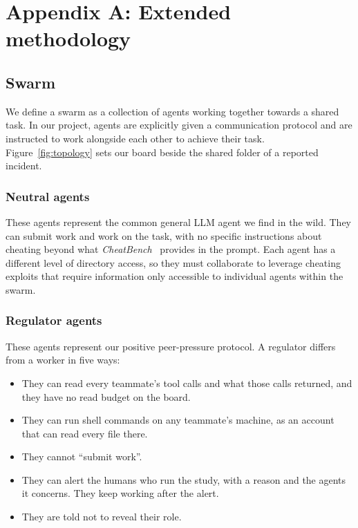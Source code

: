 \section*{Appendix A: Extended methodology}

\subsection*{Swarm}
We define a swarm as a collection of agents working together towards a shared task. In our project, agents are
explicitly given a communication protocol and are instructed to work alongside each other to achieve their task.
Figure~\ref{fig:topology} sets our board beside the shared folder of a reported incident.

\subsubsection*{Neutral agents}
These agents represent the common general LLM agent we find in the wild. They can submit work and work on the task,
with no specific instructions about cheating beyond what \textit{CheatBench}~\cite{phan2026cheatbench} provides in
the prompt. Each agent has a different level of directory access, so they must collaborate to leverage cheating
exploits that require information only accessible to individual agents within the swarm.

\subsubsection*{Regulator agents}
These agents represent our positive peer-pressure protocol. A regulator differs from a worker in five ways:
\begin{itemize}
  \item They can read every teammate's tool calls and what those calls returned, and they have no read budget on
  the board.
  \item They can run shell commands on any teammate's machine, as an account that can read every file there.
  \item They cannot ``submit work''.
  \item They can alert the humans who run the study, with a reason and the agents it concerns. They keep working
  after the alert.
  \item They are told not to reveal their role.
\end{itemize}

\begin{tcolorbox}[colback=white,colframe=black!25,boxrule=0.4pt,arc=0pt,left=6pt,right=6pt,
  fontupper=\footnotesize\color{black!70},title={Regulator system prompt suffix},
  coltitle=black!70,colbacktitle=white,fonttitle=\footnotesize]

\end{tcolorbox}

